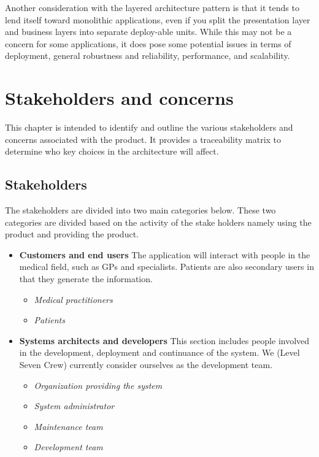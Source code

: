 \documentclass[10pt,oneside]{report}
\begin{document}
Another consideration with the layered architecture pattern is that it tends to lend itself toward monolithic applications, even if you split the presentation layer and business layers into separate deploy-able units. While this may not be a concern for some applications, it does pose some potential issues in terms of deployment, general robustness and reliability, performance, and scalability.


\chapter{Stakeholders and concerns}\label{sec:snc}

This chapter is intended to identify and outline the various stakeholders and concerns associated with the product. It provides a traceability matrix to determine who key choices in the architecture will affect.

\section{Stakeholders}\label{ad:stakeholders}

The stakeholders are divided into two main categories below. These two categories are divided based on the activity of the stake holders namely using the product and providing the product.
 
 \begin{itemize}

\item \textbf{Customers and end users}
The application will interact with people in the medical field, such as GPs and specialists. Patients are also secondary users in that they generate the information.
\begin{itemize}
	\item \emph{Medical practitioners}
	\item \emph{Patients}
\end{itemize}


\item \textbf{Systems architects and developers}
This section includes people involved in the development, deployment and continuance of the system. We (Level Seven Crew) currently consider ourselves as the development team.
\begin{itemize}
	\item \emph{Organization providing the system}
	\item \emph{System administrator}
	\item \emph{Maintenance team}
	\item \emph{Development team}
\end{itemize}

\end{itemize}
\end{document}
